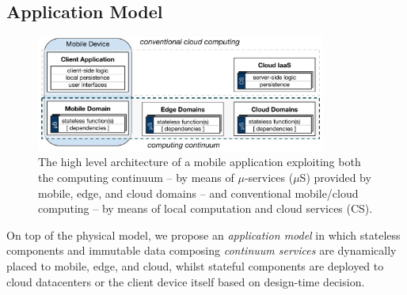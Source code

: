 




\subsection{Application Model}\label{sec:application_model}

\begin{figure}[tbp]
	\includegraphics[width=0.85\textwidth]{figs/Continuum-arch}
	\setlength{\belowcaptionskip}{-10pt}
	\caption{The high level architecture of a mobile application exploiting both the computing continuum -- by means of $\mu$-services ($\mu$S) provided by mobile, edge, and cloud domains -- and conventional mobile/cloud computing -- by means of local computation and cloud services (CS).}
	\label{fig:Continuum-arch}
\end{figure}

On top of the physical model, we propose an \textit{application model} in which stateless components and immutable data composing \textit{continuum services} are dynamically placed to mobile, edge, and cloud,
whilst 
stateful components are deployed to cloud datacenters or the client device itself based on design-time decision.

